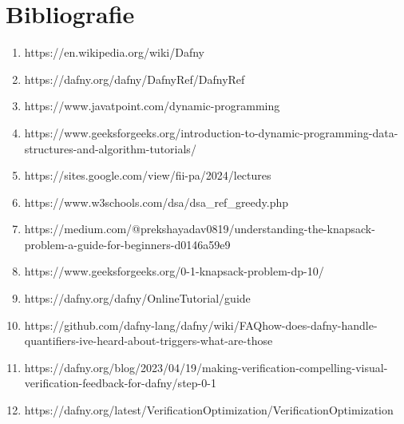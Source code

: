 \chapter*{Bibliografie} 
\begin{sloppypar}

\begin{enumerate}
    \item https://en.wikipedia.org/wiki/Dafny
    \item https://dafny.org/dafny/DafnyRef/DafnyRef
    \item https://www.javatpoint.com/dynamic-programming
    \item https://www.geeksforgeeks.org/introduction-to-dynamic-programming-data-structures-and-algorithm-tutorials/
    \item https://sites.google.com/view/fii-pa/2024/lectures
    \item https://www.w3schools.com/dsa/dsa\_ref\_greedy.php
    \item https://medium.com/@prekshayadav0819/understanding-the-knapsack-problem-a-guide-for-beginners-d0146a59e9
    \item https://www.geeksforgeeks.org/0-1-knapsack-problem-dp-10/
    \item https://dafny.org/dafny/OnlineTutorial/guide
    \item https://github.com/dafny-lang/dafny/wiki/FAQ{\texthash}how-does-dafny-handle-quantifiers-ive-heard-about-triggers-what-are-those
    \item https://dafny.org/blog/2023/04/19/making-verification-compelling-visual-verification-feedback-for-dafny/{\texthash}step-0-1
    \item https://dafny.org/latest/VerificationOptimization/VerificationOptimization
\end{enumerate}
\end{sloppypar}
